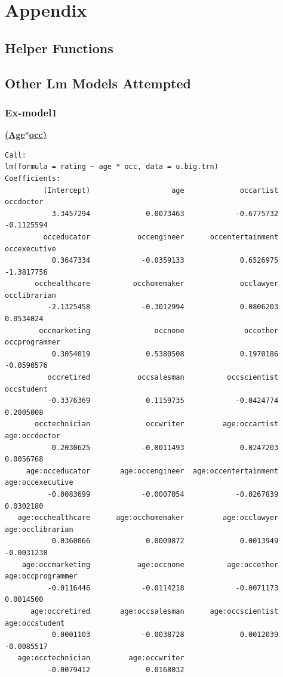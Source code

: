 \documentclass[11pt]{article}
\begin{document}
\section{Appendix}
\subsection{Helper Functions}
\subsection{Other Lm Models Attempted}
\subsubsection{Ex-model1}
\textbf{\underline{(Age$*$occ)}}
\begin{verbatim}
Call:
lm(formula = rating ~ age * occ, data = u.big.trn)
Coefficients:
         (Intercept)                   age             occartist             occdoctor  
           3.3457294             0.0073463            -0.6775732            -0.1125594  
         occeducator           occengineer      occentertainment          occexecutive  
           0.3647334            -0.0359133             0.6526975            -1.3817756  
       occhealthcare          occhomemaker             occlawyer          occlibrarian  
          -2.1325458            -0.3012994             0.0806203             0.0534024  
        occmarketing               occnone              occother         occprogrammer  
           0.3054019             0.5380508             0.1970186            -0.0590576  
          occretired           occsalesman          occscientist            occstudent  
          -0.3376369             0.1159735            -0.0424774             0.2005008  
       occtechnician             occwriter         age:occartist         age:occdoctor  
           0.2030625            -0.8011493             0.0247203             0.0056768  
     age:occeducator       age:occengineer  age:occentertainment      age:occexecutive  
          -0.0083699            -0.0007054            -0.0267839             0.0302180  
   age:occhealthcare      age:occhomemaker         age:occlawyer      age:occlibrarian  
           0.0360066             0.0009872             0.0013949            -0.0031238  
    age:occmarketing           age:occnone          age:occother     age:occprogrammer  
          -0.0116446            -0.0114218            -0.0071173             0.0014500  
      age:occretired       age:occsalesman      age:occscientist        age:occstudent  
           0.0001103            -0.0038728             0.0012039            -0.0085517  
   age:occtechnician         age:occwriter  
          -0.0079412             0.0168032  
\end{verbatim}
\end{document}
